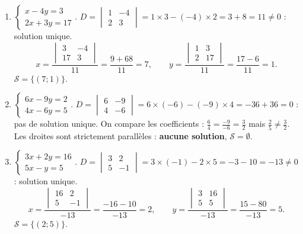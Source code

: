 \documentclass[11pt]{article}
\begin{document}
\begin{corrige}
\begin{enumerate}
\item $\begin{cases} x - 4y = 3 \\ 2x + 3y = 17 \end{cases}$.
$D = \begin{vmatrix} 1 & -4 \\ 2 & 3 \end{vmatrix} = 1\times 3 - (-4)\times 2 = 3 + 8 = 11 \neq 0$ : solution unique.
\[ x = \frac{\begin{vmatrix} 3 & -4 \\ 17 & 3 \end{vmatrix}}{11} = \frac{9 + 68}{11} = 7, \qquad
   y = \frac{\begin{vmatrix} 1 & 3 \\ 2 & 17 \end{vmatrix}}{11} = \frac{17 - 6}{11} = 1. \]
$\mathcal{S} = \{(7 ; 1)\}$.

\item $\begin{cases} 6x - 9y = 2 \\ 4x - 6y = 5 \end{cases}$.
$D = \begin{vmatrix} 6 & -9 \\ 4 & -6 \end{vmatrix} = 6\times(-6) - (-9)\times 4 = -36 + 36 = 0$ : pas de solution unique.
On compare les coefficients : $\frac{6}{4} = \frac{-9}{-6} = \frac{3}{2}$ mais $\frac{2}{5} \neq \frac{3}{2}$. Les droites sont strictement parallèles : \textbf{aucune solution}, $\mathcal{S} = \emptyset$.

\item $\begin{cases} 3x + 2y = 16 \\ 5x - y = 5 \end{cases}$.
$D = \begin{vmatrix} 3 & 2 \\ 5 & -1 \end{vmatrix} = 3\times(-1) - 2\times 5 = -3 - 10 = -13 \neq 0$ : solution unique.
\[ x = \frac{\begin{vmatrix} 16 & 2 \\ 5 & -1 \end{vmatrix}}{-13} = \frac{-16 - 10}{-13} = 2, \qquad
   y = \frac{\begin{vmatrix} 3 & 16 \\ 5 & 5 \end{vmatrix}}{-13} = \frac{15 - 80}{-13} = 5. \]
$\mathcal{S} = \{(2 ; 5)\}$.
\end{enumerate}
\end{corrige}
\end{document}
